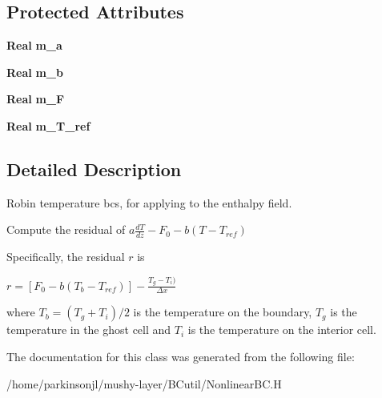 \subsection*{Protected Attributes}
\begin{DoxyCompactItemize}
\item 
\mbox{\label{class_nonlinear_temperature_b_c_robin_afe92c15fe4b2d876be91c082915e0102}} 
\textbf{ Real} {\bfseries m\+\_\+a}
\item 
\mbox{\label{class_nonlinear_temperature_b_c_robin_a355abde33043b25f93639de8bff5c08b}} 
\textbf{ Real} {\bfseries m\+\_\+b}
\item 
\mbox{\label{class_nonlinear_temperature_b_c_robin_af3024521f773bbe3d05fb39500a337ab}} 
\textbf{ Real} {\bfseries m\+\_\+F}
\item 
\mbox{\label{class_nonlinear_temperature_b_c_robin_a250705c8131bbfe423bdd461f2883edb}} 
\textbf{ Real} {\bfseries m\+\_\+\+T\+\_\+ref}
\end{DoxyCompactItemize}


\subsection{Detailed Description}
Robin temperature bcs, for applying to the enthalpy field. 

Compute the residual of $ a \frac{dT}{dz} - F_0 - b(T - T_{ref}) $

Specifically, the residual $ r $ is

$ r = \left[F_0 - b( T_b - T_{ref}) \right] - \frac{T_g - T_i)}{\Delta x} $

where $ T_b = (T_g + T_i)/2 $ is the temperature on the boundary, $ T_g $ is the temperature in the ghost cell and $ T_i $ is the temperature on the interior cell. 

The documentation for this class was generated from the following file\+:\begin{DoxyCompactItemize}
\item 
/home/parkinsonjl/mushy-\/layer/\+B\+Cutil/Nonlinear\+B\+C.\+H\end{DoxyCompactItemize}
